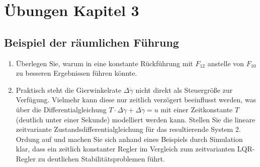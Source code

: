\section*{Übungen Kapitel 3}
\label{sec:uebung_kapitel_3}

\subsection*{Beispiel der räumlichen Führung}
\label{sec:uebung_raeumliche_fuehrung}
\begin{enumerate}
  \item Überlegen Sie, warum in  eine konstante Rückführung mit $F_{12}$ anstelle von $F_{10}$ zu besseren Ergebnissen führen könnte.
  \item Praktisch steht die Gierwinkelrate $\Delta\dot{\gamma}$ nicht direkt als Steuergröße zur Verfügung. Vielmehr kann diese nur zeitlich verzögert beeinflusst werden, was über die
  Differentialgleichung $T\cdot\Delta\ddot{\gamma}+\Delta\dot{\gamma}=u$ mit einer Zeitkonstante $T$ (deutlich unter einer Sekunde) modelliert werden kann. Stellen Sie die lineare
  zeitvariante Zustandsdifferentialgleichung für das resultierende System 2. Ordung auf und machen Sie sich anhand eines Beispiels durch Simulation klar, dass ein zeitlich konstanter
  Regler im Vergleich zum zeitvarianten \ac{LQR}-Regler zu deutlichen Stabilitätsproblemen führt.
\end{enumerate}